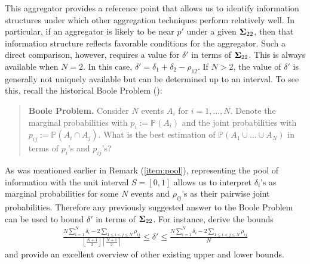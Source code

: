 \documentclass[12pt]{article}
\renewcommand{\P}{\mathbb{P}}
\theoremstyle{definition}
\theoremstyle{definition}
\def\P{{\mathbb P}}
\begin{document}
This aggregator provides a reference point that allows us to identify information structures under which other aggregation techniques perform relatively well. In particular, if an aggregator is likely to be near $p'$ under a given ${\bf\Sigma}_{22}$, then that information structure reflects favorable conditions for the aggregator. Such a direct comparison, however, requires a value for $\delta'$ in terms of ${\bf\Sigma}_{22}$. This is always available when $N = 2$. In this case, $\delta' = \delta_1 + \delta_2 - \rho_{12}$. If $N > 2$,  the value of $\delta'$ is generally not uniquely available but can be determined up to an interval. To see this, recall the historical Boole Problem (\citealt{boole1854investigation}): 

\begin{quote}
\textbf{Boole Problem.} Consider $N$ events $A_i$ for $i = 1, \dots, N$. Denote the marginal probabilities  with $p_i := \P(A_i)$ and the joint probabilities with $p_{ij} := \P(A_i \cap A_j)$. What is the best estimation of $\P(A_1 \cup \dots \cup A_N)$ in terms of $p_i$'s and $p_{ij}$'s?
\end{quote}
As was mentioned earlier in Remark (\ref{item:pool}), representing the pool of information with the unit interval $S = [0,1]$ allows us to interpret $\delta_i$'s as marginal probabilities for some $N$ events and $\rho_{ij}$'s as their pairwise joint probabilities. Therefore  any previously suggested answer to the Boole Problem can be used to bound $\delta'$ in terms of ${\bf\Sigma}_{22}$. For instance, \cite{deza1997geometry} derive the bounds
\begin{align*}
\frac{N \sum_{i=1}^N \delta_i - 2 \sum_{1 \leq i < j \leq N} \rho_{ij}}{\left\lfloor \frac{N+1}{2} \right\rfloor \left\lceil \frac{N+1}{2} \right\rceil }  \leq \delta' \leq \frac{N \sum_{i=1}^N \delta_i - 2 \sum_{1 \leq i < j \leq N} \rho_{ij}}{N} 
\end{align*}
and provide an excellent overview of other existing upper and lower bounds. 
\end{document}
